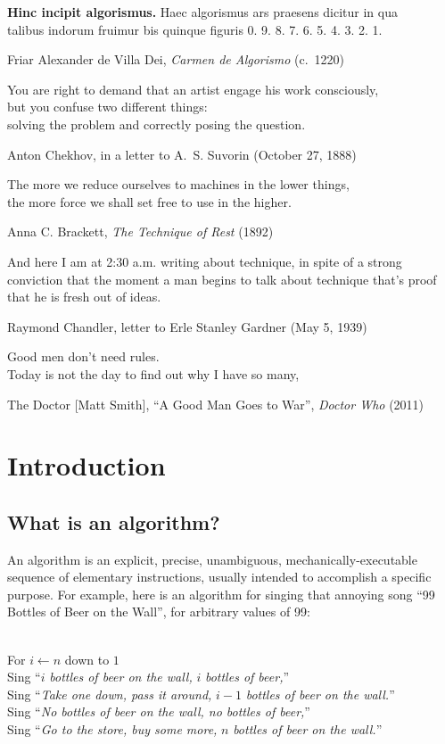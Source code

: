 \epigraph{\textbf{Hinc incipit algorismus.} Haec algorismus ars praesens dicitur in qua\\
talibus indorum fruimur bis quinque figuris 0. 9. 8. 7. 6. 5. 4. 3. 2. 1.}{Friar Alexander de Villa Dei, \textit{Carmen de Algorismo} (c.~1220)}

\epigraph{You are right to demand that an artist engage his work consciously,\\
but you confuse two different things:\\
solving the problem and correctly posing the question.}{Anton Chekhov, in a letter to A.~S. Suvorin (October 27, 1888)}

\epigraph{The more we reduce ourselves to machines in the lower things,\\
the more force we shall set free to use in the higher.}{Anna C. Brackett, \textit{The Technique of Rest} (1892)}

\epigraph{And here I am at 2:30 a.m. writing about technique, in spite of a strong conviction
that the moment a man begins to talk about technique that’s proof that he is fresh
out of ideas.}{Raymond Chandler, letter to Erle Stanley Gardner (May 5, 1939)}

\epigraph{Good men don’t need rules.\\
Today is not the day to find out why I have so many,}{The Doctor [Matt Smith], “A Good Man Goes to War”, \textit{Doctor Who} (2011)}

\chapter{Introduction}
\label{ch:0}

\section{What is an algorithm?}
\label{sec:0.1}

An algorithm is an explicit, precise, unambiguous, mechanically-executable sequence of elementary instructions, usually intended to accomplish a specific purpose. For example, here is an algorithm for singing that annoying song “99 Bottles of Beer on the Wall”, for arbitrary values of 99:

\begin{pseudocode}
\\
For $i \gets n$ down to $1$\\
\Indent Sing “$i$ {\sffamily\itshape bottles of beer on the wall,} $i$ {\sffamily\itshape bottles of beer,}”\\
\Indent Sing “{\sffamily\itshape Take one down, pass it around,} $i - 1$ {\sffamily\itshape bottles of beer on the wall.}”\\[0.8ex]
Sing “{\sffamily\itshape No bottles of beer on the wall, no bottles of beer,}”\\
Sing “{\sffamily\itshape Go to the store, buy some more,} $n$ {\sffamily\itshape bottles of beer on the wall.}”
\end{pseudocode}

